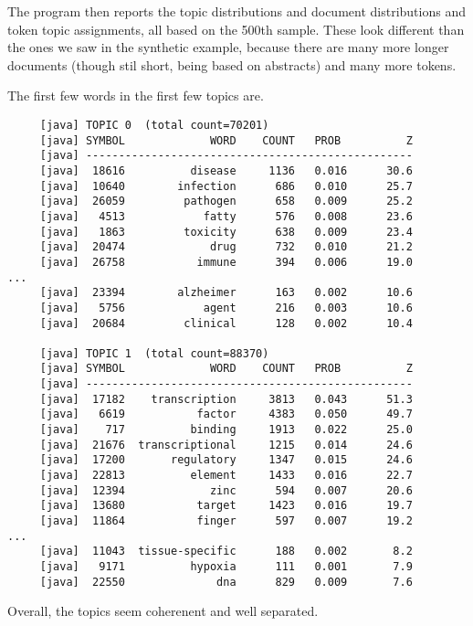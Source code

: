 The program then reports the topic distributions and document
distributions and token topic assignments, all based on the 500th
sample.  These look different than the ones we saw in the synthetic
example, because there are many more longer documents (though stil
short, being based on abstracts) and many more tokens.  

The first few words in the first few topics are.
%
\begin{verbatim}
     [java] TOPIC 0  (total count=70201)
     [java] SYMBOL             WORD    COUNT   PROB          Z
     [java] --------------------------------------------------
     [java]  18616          disease     1136   0.016      30.6
     [java]  10640        infection      686   0.010      25.7
     [java]  26059         pathogen      658   0.009      25.2
     [java]   4513            fatty      576   0.008      23.6
     [java]   1863         toxicity      638   0.009      23.4
     [java]  20474             drug      732   0.010      21.2
     [java]  26758           immune      394   0.006      19.0
...
     [java]  23394        alzheimer      163   0.002      10.6
     [java]   5756            agent      216   0.003      10.6
     [java]  20684         clinical      128   0.002      10.4

     [java] TOPIC 1  (total count=88370)
     [java] SYMBOL             WORD    COUNT   PROB          Z
     [java] --------------------------------------------------
     [java]  17182    transcription     3813   0.043      51.3
     [java]   6619           factor     4383   0.050      49.7
     [java]    717          binding     1913   0.022      25.0
     [java]  21676  transcriptional     1215   0.014      24.6
     [java]  17200       regulatory     1347   0.015      24.6
     [java]  22813          element     1433   0.016      22.7
     [java]  12394             zinc      594   0.007      20.6
     [java]  13680           target     1423   0.016      19.7
     [java]  11864           finger      597   0.007      19.2
...
     [java]  11043  tissue-specific      188   0.002       8.2
     [java]   9171          hypoxia      111   0.001       7.9
     [java]  22550              dna      829   0.009       7.6
\end{verbatim}
%
Overall, the topics seem coherenent and well separated.  

